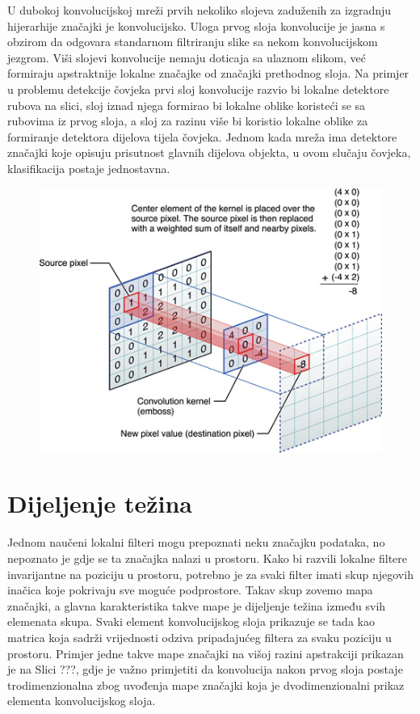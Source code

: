 \documentclass[lmodern, utf8, diplomski, numeric]{fer}
\begin{document}
U dubokoj konvolucijskoj mreži prvih nekoliko slojeva zaduženih za izgradnju hijerarhije značajki je konvolucijsko. Uloga prvog sloja konvolucije je jasna s obzirom da odgovara standarnom filtriranju slike sa nekom konvolucijskom jezgrom. Viši slojevi konvolucije nemaju doticaja sa ulaznom slikom, već formiraju apstraktnije lokalne značajke od značajki prethodnog sloja. Na primjer u problemu detekcije čovjeka prvi sloj konvolucije razvio bi lokalne detektore rubova na slici, sloj iznad njega formirao bi lokalne oblike koristeći se sa rubovima iz prvog sloja, a sloj za razinu više bi koristio lokalne oblike za formiranje detektora dijelova tijela čovjeka. Jednom kada mreža ima detektore značajki koje opisuju prisutnost glavnih dijelova objekta, u ovom slučaju čovjeka, klasifikacija postaje jednostavna.

\begin{figure}[ht!]
\centering
\includegraphics[width=14cm]{slike/kernel_convolution.jpg}
\caption{}
\end{figure}

\section{Dijeljenje težina}

Jednom naučeni lokalni filteri mogu prepoznati neku značajku podataka, no nepoznato je gdje se ta značajka nalazi u prostoru. Kako bi razvili lokalne filtere invarijantne na poziciju u prostoru, potrebno je za svaki filter imati skup njegovih inačica koje pokrivaju sve moguće podprostore. Takav skup zovemo mapa značajki, a glavna karakteristika takve mape je dijeljenje težina između svih elemenata skupa. Svaki element konvolucijskog sloja prikazuje se tada kao matrica koja sadrži vrijednosti odziva  pripadajućeg filtera za svaku poziciju u prostoru. Primjer jedne takve mape značajki na višoj razini apstrakciji prikazan je na Slici ???, gdje je važno primjetiti da konvolucija nakon prvog sloja postaje trodimenzionalna zbog uvođenja mape značajki koja je dvodimenzionalni prikaz elementa konvolucijskog sloja.
\end{document}
